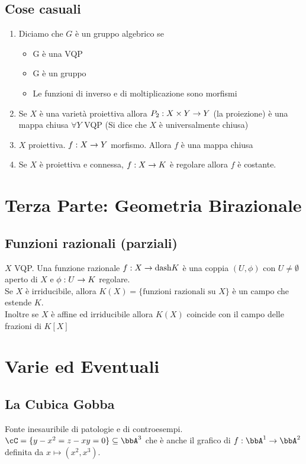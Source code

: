 \documentclass[a4paper,NoNotes,GeneralMath]{stdmdoc}
\begin{document}
	\subsection*{Cose casuali}
	\begin{enumerate}
	\item Diciamo che $G$ è un gruppo algebrico se
		\begin{itemize}
			\item G è una VQP
			\item G è un gruppo
			\item Le funzioni di inverso e di moltiplicazione sono morfismi
		\end{itemize}
	\item Se $X$ è una varietà proiettiva allora $P_2: X \times Y \rightarrow Y$ (la proiezione) è una mappa chiusa $\forall Y$ VQP (Si dice che $X$ è universalmente chiusa)
	\item $X$ proiettiva. $f: X \rightarrow Y$ morfismo. Allora $f$ è una mappa chiusa
	\item Se $X$ è proiettiva e connessa, $f: X \rightarrow K$ è regolare allora $f$ è costante.
	\end{enumerate}	
	
	\section*{Terza Parte: Geometria Birazionale}
	\subsection*{Funzioni razionali (parziali)}
	$X$ VQP. Una funzione razionale $f: X \rightarrow \text{dash} K$ è una coppia $(U, \phi)$ con $U \neq \emptyset$ aperto di $X$ e $\phi: U \rightarrow K$ regolare. \\
	Se $X$ è irriducibile, allora $K(X) = \{ \text{funzioni razionali su } X\}$ è un campo che estende $K$. \\
	Inoltre se $X$ è affine ed irriducibile allora $K(X)$ coincide con il campo delle frazioni di $K[X]$ \\
	
	
	
	\section*{Varie ed Eventuali}
	\subsection*{La Cubica Gobba}
	Fonte inesauribile di patologie e di controesempi. $\cC = \{ y-x^2 = z-xy = 0 \} \subseteq \bbA^3$ che è anche il grafico di $f: \bbA^1 \rar \bbA^2$ definita da $x \mapsto (x^2, x^3)$.
	
\end{document}
